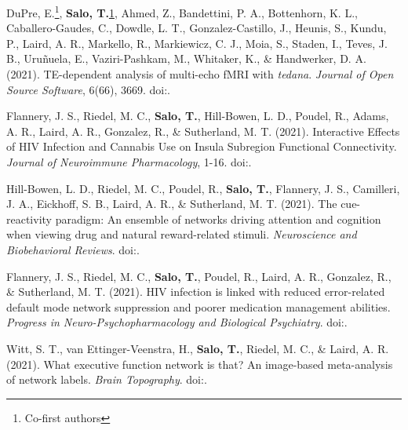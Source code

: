 \documentclass[10pt]{article}
\newcommand{\textlink}[3][blue]{\href{#2}{\color{#1}{#3}}}
\begin{document}
\begin{hangparas}{.25in}{1}

	DuPre, E.\footnote{\label{note1}Co-first authors},
	\textbf{Salo, T.}\cref{note1},
	Ahmed, Z., Bandettini, P. A., Bottenhorn, K. L., Caballero-Gaudes, C., Dowdle, L. T.,
	Gonzalez-Castillo, J., Heunis, S., Kundu, P., Laird, A. R., Markello, R., Markiewicz, C. J.,
	Moia, S., Staden, I., Teves, J. B., Uruñuela, E., Vaziri-Pashkam, M., Whitaker, K.,
	\& Handwerker, D. A. (2021).
	TE-dependent analysis of multi-echo fMRI with \emph{tedana}.
	\emph{Journal of Open Source Software}, 6(66), 3669.
	doi:\textlink{https://doi.org/10.21105/joss.03669}{10.21105/joss.03669}.

	\bigskip

	Flannery, J. S., Riedel, M. C., \textbf{Salo, T.}, Hill-Bowen, L. D., Poudel, R., Adams, A. R.,
	Laird, A. R., Gonzalez, R., \& Sutherland, M. T. (2021).
	Interactive Effects of HIV Infection and Cannabis Use on Insula Subregion Functional Connectivity.
	\emph{Journal of Neuroimmune Pharmacology}, 1-16.
	doi:\textlink{https://doi.org/10.1007/s11481-021-10005-8}{10.1007/s11481-021-10005-8}.

	\bigskip

	Hill-Bowen, L. D., Riedel, M. C., Poudel, R., \textbf{Salo, T.}, Flannery, J. S.,
	Camilleri, J. A., Eickhoff, S. B., Laird, A. R., \& Sutherland, M. T. (2021).
	The cue-reactivity paradigm: An ensemble of networks driving attention and cognition
	when viewing drug and natural reward-related stimuli.
	\emph{Neuroscience and Biobehavioral Reviews}.
	doi:\textlink{https://doi.org/10.1016/j.neubiorev.2021.08.010}{10.1016/j.neubiorev.2021.08.010}.

	\bigskip

	Flannery, J. S., Riedel, M. C., \textbf{Salo, T.}, Poudel, R., Laird, A. R.,
	Gonzalez, R., \& Sutherland, M. T. (2021).
	HIV infection is linked with reduced error-related default mode network suppression and poorer
	medication management abilities.
	\emph{Progress in Neuro-Psychopharmacology and Biological Psychiatry}.
	doi:\textlink{https://doi.org/10.1016/j.pnpbp.2021.110398}{10.1016/j.pnpbp.2021.110398}.

	\bigskip

	Witt, S. T., van Ettinger-Veenstra, H., \textbf{Salo, T.}, Riedel, M. C., \& Laird, A. R. (2021).
    What executive function network is that? An image-based meta-analysis of network labels.
    \emph{Brain Topography}.
    doi:\textlink{https://doi.org/10.1007/s10548-021-00847-z}{10.1007/s10548-021-00847-z}.


\end{hangparas}
\end{document}
